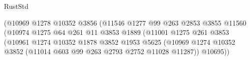 \begin{lexlean}{RustStd}
\begin{coremodule}
                                                (@10969
                                                  @1278
                                                  @10352
                                                  @3856
                                                  (@11546
                                                    @1277
                                                    @99
                                                    @263
                                                    @2853
                                                    @3855
                                                    @11560
                                                    (@10974
                                                      @1275
                                                      @64
                                                      @261
                                                      @11
                                                      @3853
                                                      @1889
                                                      (@11001
                                                        @1275
                                                        @261
                                                        @3853
                                                        (@10961
                                                          @1274
                                                          @10352
                                                          @1878
                                                          @3852
                                                          @1953
                                                          @5625
                                                          (@10969
                                                            @1274
                                                            @10352
                                                            @3852
                                                            (@11014
                                                              @603
                                                              @99
                                                              @263
                                                              @2793
                                                              @2752
                                                              @11028
                                                              @11287))
                                                          @10695))

\end{coremodule}
\end{lexlean}
